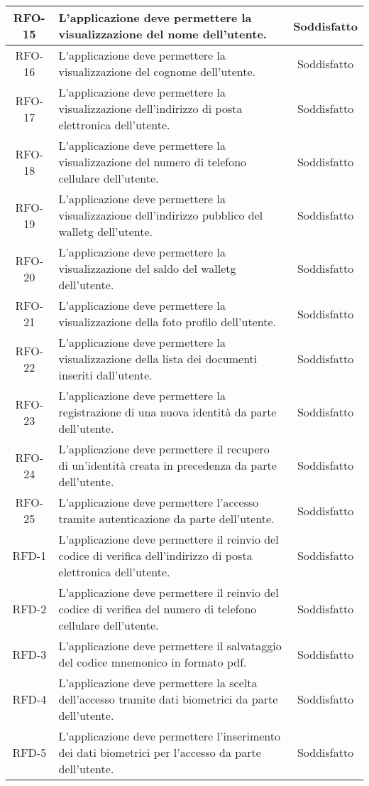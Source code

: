 \begin{longtable}{|c|p{7.65cm}|c|}
	\hline
	RFO-15    & L'applicazione deve permettere la visualizzazione del nome dell'utente. & Soddisfatto \\
	\hline
	RFO-16    & L'applicazione deve permettere la visualizzazione del cognome dell'utente. & Soddisfatto \\
	\hline
	RFO-17    & L'applicazione deve permettere la visualizzazione dell'indirizzo di posta elettronica dell'utente. & Soddisfatto \\
	\hline
	RFO-18    & L'applicazione deve permettere la visualizzazione del numero di telefono cellulare dell'utente. & Soddisfatto \\
	\hline
	RFO-19    & L'applicazione deve permettere la visualizzazione dell'indirizzo pubblico del \gls{walletg} dell'utente. & Soddisfatto \\
	\hline
	RFO-20    & L'applicazione deve permettere la visualizzazione del saldo del \gls{walletg} dell'utente. & Soddisfatto \\
	\hline
	RFO-21    & L'applicazione deve permettere la visualizzazione della foto profilo dell'utente. & Soddisfatto \\
	\hline
	RFO-22    & L'applicazione deve permettere la visualizzazione della lista dei documenti inseriti dall'utente. & Soddisfatto \\
	\hline
	RFO-23    & L'applicazione deve permettere la registrazione di una nuova identità da parte dell'utente. & Soddisfatto \\
	\hline
	RFO-24    & L'applicazione deve permettere il recupero di un'identità creata in precedenza da parte dell'utente. & Soddisfatto \\
	\hline
	RFO-25    & L'applicazione deve permettere l'accesso tramite autenticazione da parte dell'utente. & Soddisfatto \\
	\hline
	RFD-1     & L'applicazione deve permettere il reinvio del codice di verifica dell'indirizzo di posta elettronica dell'utente. & Soddisfatto \\
	\hline
	RFD-2     & L'applicazione deve permettere il reinvio del codice di verifica del numero di telefono cellulare dell'utente. & Soddisfatto \\
	\hline
	RFD-3     & L'applicazione deve permettere il salvataggio del codice mnemonico in formato \gls{pdf}. & Soddisfatto \\
	\hline
	RFD-4     & L'applicazione deve permettere la scelta dell'accesso tramite dati biometrici da parte dell'utente. & Soddisfatto \\
	\hline
	RFD-5     & L'applicazione deve permettere l'inserimento dei dati biometrici per l'accesso da parte dell'utente. & Soddisfatto \\

\end{longtable}
